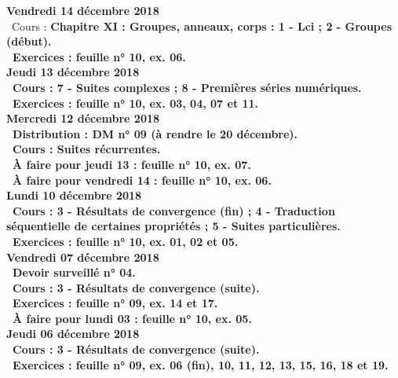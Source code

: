 \documentclass[12pt,a4paper]{article}
\begin{document}
\noindent\textbf{Vendredi 14 décembre 2018}\\
\bu\ Cours : \bf Chapitre XI \rm : Groupes, anneaux, corps  : 1 - Lci ; 2 - Groupes (début).\\ 
\bu\ Exercices : feuille n° 10, ex. 06.\vspace{.4cm}\\
 
\noindent\textbf{Jeudi 13 décembre 2018}\\
\bu\ Cours : 7 - Suites complexes ; 8 - Premières séries numériques.\\
\bu\ Exercices : feuille n° 10, ex. 03, 04, 07 et 11.\vspace{.4cm}\\
 
\noindent\textbf{\bf Mercredi 12 décembre 2018}\\
\bu\ Distribution : DM n° 09 (à rendre le 20 décembre).\\
\bu\ Cours : Suites récurrentes.\\
\bu\ À faire pour jeudi 13 : feuille n° 10, ex. 07.\\
\bu\ À faire pour vendredi 14 : feuille n° 10, ex. 06.\vspace{.4cm}\\

\noindent\textbf{Lundi 10 décembre 2018}\\
\bu\ Cours : 3 - Résultats de convergence (fin) ; 4 - Traduction séquentielle de certaines propriétés ; 5 - Suites particulières.\\
\bu\ Exercices : feuille n° 10, ex. 01, 02 et 05.\vspace{.4cm}\\
 
\noindent\textbf{Vendredi 07 décembre 2018}\\
\bu\ Devoir surveillé n° 04.\\
\bu\ Cours : 3 - Résultats de convergence (suite).\\
\bu\ Exercices : feuille n° 09, ex. 14 et 17.\\
\bu\ À faire pour lundi 03 : feuille n° 10, ex. 05.\vspace{.4cm}\\
 
\noindent\textbf{Jeudi 06 décembre 2018}\\
\bu\ Cours : 3 - Résultats de convergence (suite).\\
\bu\ Exercices : feuille n° 09, ex. 06 (fin), 10, 11, 12, 13, 15, 16, 18 et 19.\vspace{.4cm}\\
 
\end{document}
